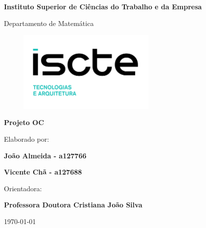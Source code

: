 
\thispagestyle{empty}
\setcounter{page}{-1}

\begin{center}
\begin{Huge}
\textbf{Instituto Superior de Ciências do Trabalho e da Empresa}
\end{Huge}
\end{center}

\begin{center}
\begin{Huge}
Departamento de Matemática
\end{Huge}
\end{center}

\vspace{0,07cm}
\begin{figure}[!htb]
\centering
\includegraphics[width=191pt]{iscte_ista.png}
\end{figure}

\vspace{0.5cm}
\begin{center}
\begin{Large}
\textbf{Projeto OC}
\end{Large}
\end{center}


\vspace{0.5cm}
\begin{center}
\begin{normalsize}
\begin{large}
Elaborado por:
\end{large}
\end{normalsize}
\end{center}

\vspace{0.2cm}
\begin{center}
\begin{large}
\textbf{João Almeida - a127766}

\textbf{Vicente Chã - a127688}
\end{large}
\end{center}

\vspace{0,5cm}
\begin{center}
\begin{normalsize}
\begin{large}
Orientadora:
\end{large}
\end{normalsize}
\end{center}

\vspace{0.2cm}
\begin{center}
\begin{large}
\textbf{Professora Doutora Cristiana João Silva}
\end{large}
\end{center}



\vspace{0.5cm}
\begin{center}
\begin{normalsize}
\today
\end{normalsize}
\end{center}
